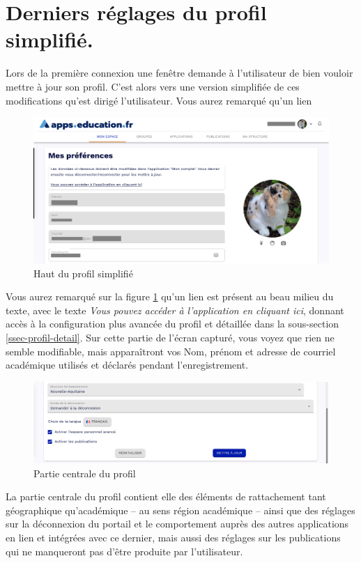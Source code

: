 \section{Derniers réglages du profil simplifié.}
Lors de la première connexion une fenêtre demande à l'utilisateur de bien vouloir mettre à jour son profil. 
C'est alors vers une version simplifiée de ces modifications qu'est dirigé l'utilisateur. 
Vous aurez remarqué qu'un lien 
\begin{figure} \label{fig-profil-haut}
	\centering
	\includegraphics{./Captures/portail.profil.haut.png}
	\caption{Haut du profil simplifié}
\end{figure}
Vous aurez remarqué sur la figure \ref{fig-profil-haut} qu'un lien est présent au beau milieu du texte, avec le texte \emph{Vous pouvez accéder à l'application en cliquant ici}, donnant accès à la configuration plus avancée du profil et détaillée dans la sous-section \ref{ssec-profil-detail}. 
Sur cette partie de l'écran capturé, vous voyez que rien ne semble modifiable, mais apparaîtront vos Nom, prénom et adresse de courriel académique utilisés et déclarés pendant l'enregistrement.
\begin{figure}
	\centering
	\includegraphics{./Captures/portail.profil.milieu.png}
	\caption{Partie centrale du profil}
\end{figure}
La partie centrale du profil contient elle des éléments de rattachement tant géographique qu'académique -- au sens région académique -- ainsi que des réglages sur la déconnexion du portail et le comportement auprès des autres applications en lien et intégrées avec ce dernier, mais aussi des réglages sur les publications qui ne manqueront pas d'être produite par l'utilisateur.
